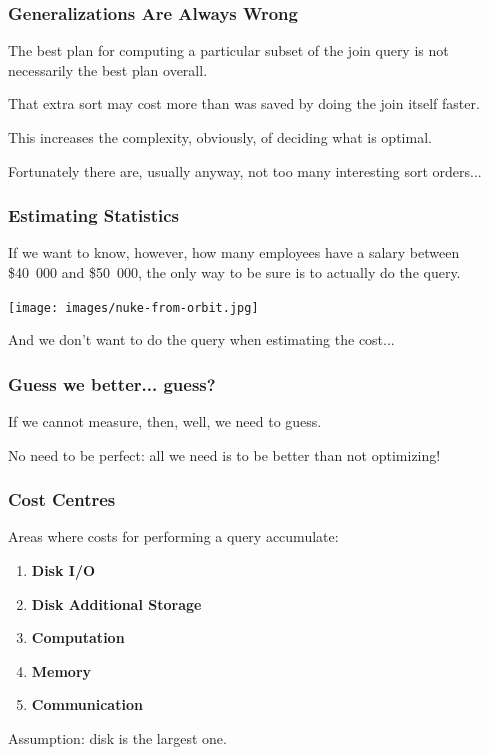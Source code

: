 \begin{frame}
\frametitle{Generalizations Are Always Wrong}

The best plan for computing a particular subset of the join query is not necessarily the best plan overall. 

That extra sort may cost more than was saved by doing the join itself faster. 

This increases the complexity, obviously, of deciding what is optimal. 

Fortunately there are, usually anyway, not too many interesting sort orders...

\end{frame}

\begin{frame}
\frametitle{Estimating Statistics}

If we want to know, however, how many employees have a salary between \$40~000 and \$50~000, the only way to be sure is to actually do the query.

\begin{center}
	\texttt{[image: images/nuke-from-orbit.jpg]}
\end{center}

And we don't want to do the query when estimating the cost...

\end{frame}


\begin{frame}
\frametitle{Guess we better... guess?}

If we cannot measure, then, well, we need to guess.

No need to be perfect: all we need is to be better than not optimizing!

\end{frame}

\begin{frame}
\frametitle{Cost Centres}

Areas where costs for performing a query accumulate:

\begin{enumerate}
	\item \textbf{Disk I/O}
	\item \textbf{Disk Additional Storage}
	\item \textbf{Computation}
	\item \textbf{Memory}
	\item \textbf{Communication}
\end{enumerate}

Assumption: disk is the largest one.

\end{frame}



